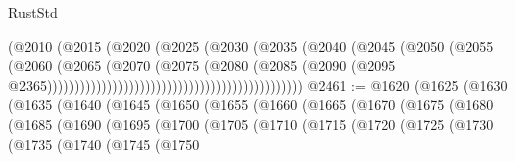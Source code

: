 \begin{lexlean}{RustStd}
\begin{coremodule}
{\begin{coremodule}
{{{{{{{{{{{{{{{{{{{{{{{{{{{{{{{{{{{{{{{{{{{{{{{{{{{{{{{{{{{{                                                              (@2010
                                                                (@2015
                                                                  (@2020
                                                                    (@2025
                                                                      (@2030
                                                                        (@2035
                                                                          (@2040
                                                                            (@2045
                                                                              (@2050
                                                                                (@2055
                                                                                  (@2060
                                                                                    (@2065
                                                                                      (@2070
                                                                                        (@2075
                                                                                          (@2080
                                                                                            (@2085
                                                                                              (@2090
                                                                                                (@2095
                                                                                                  @2365)))))))))))))))))))))))))))))))))))))))))))))))
@2461 := @1620
    (@1625
      (@1630
        (@1635
          (@1640
            (@1645
              (@1650
                (@1655
                  (@1660
                    (@1665
                      (@1670
                        (@1675
                          (@1680
                            (@1685
                              (@1690
                                (@1695
                                  (@1700
                                    (@1705
                                      (@1710
                                        (@1715
                                          (@1720
                                            (@1725
                                              (@1730
                                                (@1735
                                                  (@1740
                                                    (@1745
                                                      (@1750
}}}}}}}}}}}}}}}}}}}}}}}}}}}}}}}}}}}}}}}}}}}}}}}}}}}}}}}}}}}}
\end{coremodule}}
\end{coremodule}
\end{lexlean}
